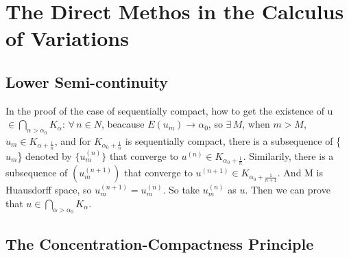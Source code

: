 \section{The Direct Methos in the Calculus of Variations}

\subsection{Lower Semi-continuity}

\begin{theorem*}[1.1]\label{C1S1_1.1}
    
\end{theorem*}
\begin{remark*}
    In the proof of the case of sequentially compact, how to get the existence of u $\in \bigcap_{\alpha>\alpha_0}K_\alpha$:
    $\forall \, n\in N$, beacause $E(u_m)\rightarrow \alpha_0$, so $\exists \, M$, when $m>M$, $u_m\in K_{\alpha+\frac{1}{n}}$, and for $K_{\alpha_0+\frac{1}{n}}$ is sequentially compact, there is a subsequence of \{$u_m$\} denoted by $\{u_m^{(n)}\}$ that converge to $u^{(n)}\in K_{\alpha_{0}+\frac{1}{n}}$. Similarily, there is a subsequence of $(u_m^{(n+1)})$ that converge to $u^{(n+1)}\in K_{\alpha_0+\frac{1}{n+1}}$. And M is Huausdorff space, so $u_m^{(n+1)}=u_m^{(n)}$. So take $u_m^{(n)}$ as $u$. Then we can prove that $u\in \bigcap_{\alpha>\alpha_0}K_{\alpha}$.
\end{remark*}

\subsection{}

\subsection{}

\subsection{The Concentration-Compactness Principle}


\begin{lemma*}\label{C1S4_4.3}
    
\end{lemma*}

\begin{lemma*}\label{C1S4_4.8}
    
\end{lemma*}

